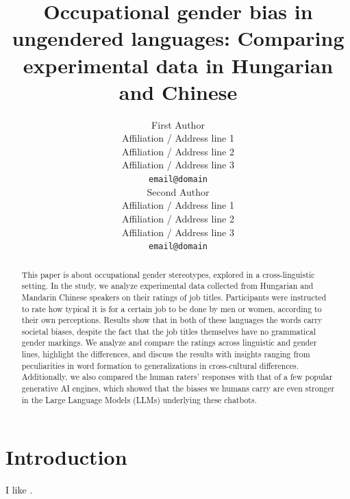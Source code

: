 \documentclass[11pt]{article}
\title{Occupational gender bias in ungendered languages: Comparing experimental data in Hungarian and Chinese}
\author{First Author \\
  Affiliation / Address line 1 \\
  Affiliation / Address line 2 \\
  Affiliation / Address line 3 \\
  \texttt{email@domain} \\\And
  Second Author \\
  Affiliation / Address line 1 \\
  Affiliation / Address line 2 \\
  Affiliation / Address line 3 \\
  \texttt{email@domain} \\}
\begin{document}
\maketitle

\begin{abstract}
This paper is about occupational gender stereotypes, explored in a cross-linguistic setting. In the study, we analyze experimental data collected from Hungarian and Mandarin Chinese speakers on their ratings of job titles. Participants were instructed to rate how typical it is for a certain job to be done by men or women, according to their own perceptions. Results show that in both of these languages the words carry societal biases, despite the fact that the job titles themselves have no grammatical gender markings. We analyze and compare the ratings across linguistic and gender lines, highlight the differences, and discuss the results with insights ranging from peculiarities in word formation to generalizations in cross-cultural differences. Additionally, we also compared the human raters' responses with that of a few popular generative AI engines, which showed that the biases we humans carry are even stronger in the Large Language Models (LLMs) underlying these chatbots.
\end{abstract}

\section{Introduction}

I like \citet{kaukonen_2025_gender}.





\end{document}

